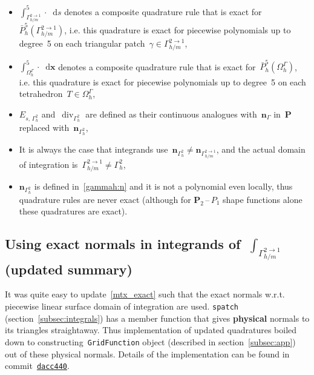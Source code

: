\documentclass[12pt]{article}
\newcommand{\vect}[1]{\boldsymbol{\mathbf{#1}}}
\newcommand*\diff{\mathop{}\!\mathrm{d}}
\DeclareMathOperator{\Div}{div}
\begin{document}
\begin{itemize}
	\item $\int^5_{\Gamma_{h/m}^{2 \to 1}} \cdot \diff{s}$ denotes a composite quadrature rule that is exact for~$\bar P_h^5(\Gamma_{h/m}^{2 \to 1})$, i.e. this quadrature is exact for piecewise polynomials up to degree~5 on each triangular patch~$\gamma \in \Gamma_{h/m}^{2 \to 1}$, 
	\item $\int^5_{\Omega^{\Gamma}_h} \cdot \diff{\vect x}$ denotes a composite quadrature rule that is exact for~$\bar P_h^5(\Omega^{\Gamma}_h)$, i.e. this quadrature is exact for piecewise polynomials up to degree~5 on each tetrahedron~$T \in \Omega^{\Gamma}_h$, 
	\item $E_{s,\,\Gamma_{h}^2}$ and~$\Div_{\Gamma_{h}^2}$ are defined as their continuous analogues with~$\vect n_{\Gamma}$ in~$\vect P$ replaced with~$\vect n_{\Gamma_{h}^2}$,
	\item It is always the case that integrands use~$\vect n_{\Gamma_{h}^2} \ne \vect n_{\Gamma_{h/m}^{2 \to 1}}$, and the actual domain of integration is~$\Gamma_{h/m}^{2 \to 1} \ne \Gamma_{h}^2$,
	\item $\vect n_{\Gamma_{h}^2}$ is defined in~\eqref{gammah:n} and it is not a polynomial even locally, thus quadrature rules are never exact (although for $\vect P_2$\,--\,$P_1$ shape functions alone these quadratures are exact).
\end{itemize}

\subsection{Using exact normals in integrands of~$\int_{\Gamma_{h/m}^{2 \to 1}}$ (updated summary)}

It was quite easy to update~\eqref{mtx_exact} such that the exact normals w.r.t. piecewise linear surface domain of integration are used. \texttt{spatch} (section~\ref{subsec:integrals}) has a member function that gives \textbf{physical} normals to its triangles straightaway. Thus implementation of updated quadratures boiled down to constructing~\texttt{GridFunction} object (described in section~\ref{subsec:app}) out of these physical normals. Details of the implementation can be found in commit~\texttt{\href{https://github.com/56th/drops/commit/dacc440587a3f1ea56186fd8c1ff6b6e3ea4b730}{dacc440}}.
\end{document}
